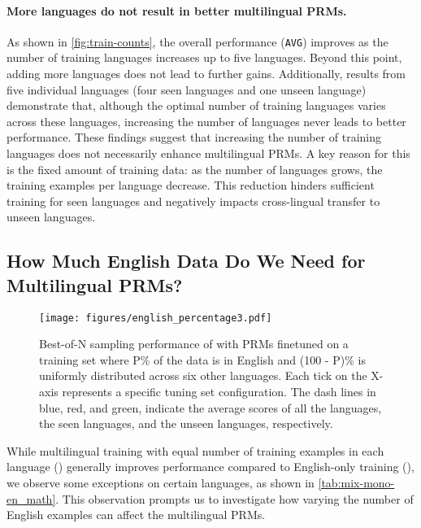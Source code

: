 \paragraph{More languages do not result in better multilingual PRMs.}
As shown in \autoref{fig:train-counts}, the overall performance (\texttt{AVG}) improves as the number of training languages increases up to five languages. Beyond this point, adding more languages does not lead to further gains. Additionally, results from five individual languages (four seen languages and one unseen language) demonstrate that, although the optimal number of training languages varies across these languages, increasing the number of languages never leads to better performance. These findings suggest that increasing the number of training languages does not necessarily enhance multilingual PRMs. A key reason for this is the fixed amount of training data: as the number of languages grows, the training examples per language decrease. This reduction hinders sufficient training for seen languages and negatively impacts cross-lingual transfer to unseen languages.

\subsection{How Much English Data Do We Need for Multilingual PRMs?}
\label{sec:results_english_percentage}

\begin{figure}[t]
    \centering
    \texttt{[image: figures/english\_percentage3.pdf]}
    \caption{
    Best-of-N sampling performance of \llama 
    with PRMs finetuned on a training set where P\% of the data is in English and (100 - P)\% is uniformly distributed across six other languages. Each tick on the X-axis represents a specific tuning set configuration. 
    The dash lines in {\color{blue}blue}, {\color{red}red}, and {\color{green}green}, indicate the average scores of all the languages, the seen languages, and the unseen languages, respectively.
}
    \label{fig:english-percentage}
\end{figure}

While multilingual training with equal number of training examples in each language (\mix) generally improves performance compared to English-only training (\en), we observe some exceptions on certain languages, as shown in \autoref{tab:mix-mono-en_math}. This observation prompts us to investigate how varying the number of English examples can affect the multilingual PRMs.


